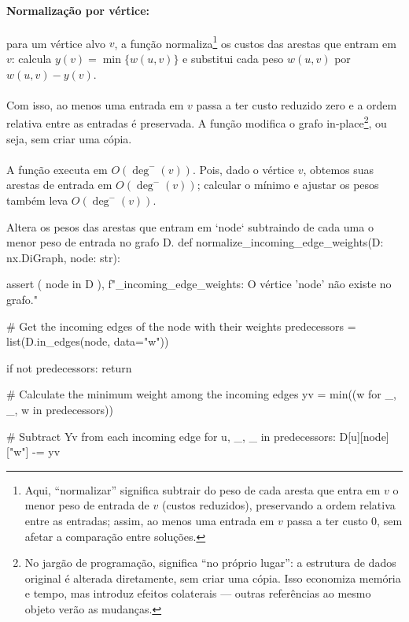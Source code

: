 \documentclass[12pt,a4paper]{article}
\def\emph#1{#1}%
\begin{document}
\paragraph{Normalização por vértice:}
para um vértice alvo $v$, a função normaliza\footnote{Aqui, “normalizar” significa subtrair do peso de cada aresta que entra em $v$ o menor peso de entrada de $v$ (custos reduzidos), preservando a ordem relativa entre as entradas; assim, ao menos uma entrada em $v$ passa a ter custo 0, sem afetar a comparação entre soluções.} os custos das arestas que \emph{entram} em $v$: calcula $y(v)=\min\{w(u,v)\}$ e
substitui cada peso $w(u,v)$ por $w(u,v)-y(v)$.

\paragraph{}
Com isso, ao menos uma entrada em $v$ passa a ter custo reduzido zero e a ordem relativa entre as entradas é preservada. A função modifica o grafo \emph{in-place}\footnote{No jargão de programação, significa “no próprio lugar”: a estrutura de dados original é alterada diretamente, sem criar uma cópia. Isso economiza memória e tempo, mas introduz efeitos colaterais — outras referências ao mesmo objeto verão as mudanças.}, ou seja, sem criar uma cópia.

\paragraph{}
A função executa em $O(\deg^-(v))$. Pois, dado o vértice $v$, obtemos suas arestas de entrada em $O(\deg^-(v))$; calcular o mínimo e ajustar os pesos também leva $O(\deg^-(v))$.

\begin{pybox}[title={Normalização por vértice: custos reduzidos},colback=blue!5!white,colframe=blue!75!black]{Altera os pesos das arestas que entram em `node` subtraindo de cada uma o menor peso de entrada no grafo D.}
def normalize_incoming_edge_weights(D: nx.DiGraph, node: str):
    
    assert (
        node in D
    ), f"\nnormalize_incoming_edge_weights: O vértice '{node}' não existe no grafo."
        
    # Get the incoming edges of the node with their weights
    predecessors = list(D.in_edges(node, data="w"))

    if not predecessors:
        return

    # Calculate the minimum weight among the incoming edges
    yv = min((w for _, _, w in predecessors))

    # Subtract Yv from each incoming edge
    for u, _, _ in predecessors:
        D[u][node]["w"] -= yv
\end{pybox}
\end{document}
